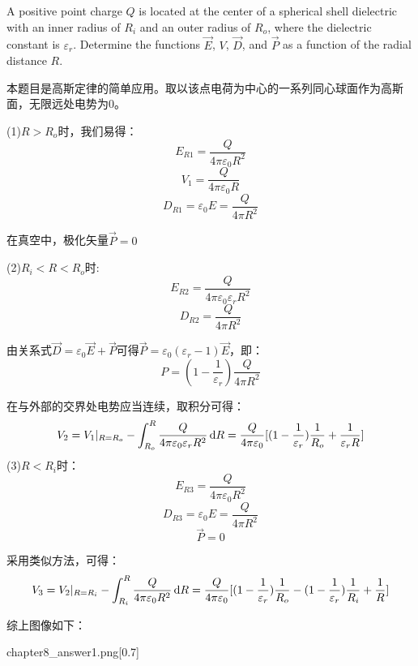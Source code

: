 \chapter[电磁学]{}
\begin{solution}[Polarization]
    A positive point charge $Q$ is located at the center of a spherical shell dielectric with an inner radius of $R_i$ and an outer radius of $R_o$, 
    where the dielectric constant is $\varepsilon_r$. Determine the functions $\vec{E}$, $V$, $\vec{D}$, and $\vec{P}$ as a function of the radial distance $R$.
    \tcbrule

    本题目是高斯定律的简单应用。取以该点电荷为中心的一系列同心球面作为高斯面，无限远处电势为0。

    (1)$R > R_o$时，我们易得：
    \[E_{R1} = \dfrac{Q}{4\pi \varepsilon_0 R^2}\]
    \[V_1 = \dfrac{Q}{4\pi \varepsilon_0 R}\]
    \[D_{R1} = \varepsilon_0 E = \dfrac{Q}{4\pi R^2}\]
    
    在真空中，极化矢量$\vec{P} = 0$
    
    (2)$R_i < R < R_o$时:
    \[E_{R2} = \dfrac{Q}{4\pi \varepsilon_0\varepsilon_r R^2}\]
    \[D_{R2} = \dfrac{Q}{4\pi R^2}\]
    
    由关系式$\vec{D} = \varepsilon_0\vec{E} + \vec{P}$可得$\vec{P} = \varepsilon_0(\varepsilon_r - 1)\vec{E}$，即：
    \[P = (1-\dfrac{1}{\varepsilon_r})\dfrac{Q}{4\pi R^2}\]

    在与外部的交界处电势应当连续，取积分可得：
    \[V_2 = V_1|_{R=R_o} - \int_{R_o}^{R}\dfrac{Q}{4\pi \varepsilon_0\varepsilon_r R^2}\dif R = \dfrac{Q}{4\pi \varepsilon_0}[(1-\dfrac{1}{\varepsilon_r})\dfrac{1}{R_o} + \dfrac{1}{\varepsilon_r R}]\]
    (3)$R < R_i$时：
    \[E_{R3} = \dfrac{Q}{4\pi \varepsilon_0 R^2}\]
    \[D_{R3} = \varepsilon_0 E = \dfrac{Q}{4\pi R^2}\]
    \[\vec{P} = 0\]

    采用类似方法，可得：
    \[V_3 = V_2|_{R = R_i} - \int_{R_i}^{R}\dfrac{Q}{4\pi \varepsilon_0 R^2}\dif R = \dfrac{Q}{4\pi \varepsilon_0}[(1-\dfrac{1}{\varepsilon_r})\dfrac{1}{R_o} - (1-\dfrac{1}{\varepsilon_r})\dfrac{1}{R_i} + \dfrac{1}{R}]\]

    综上图像如下：
    \begin{singlefigure}{chapter8_answer1.png}[0.7]
    \end{singlefigure}
\end{solution}

